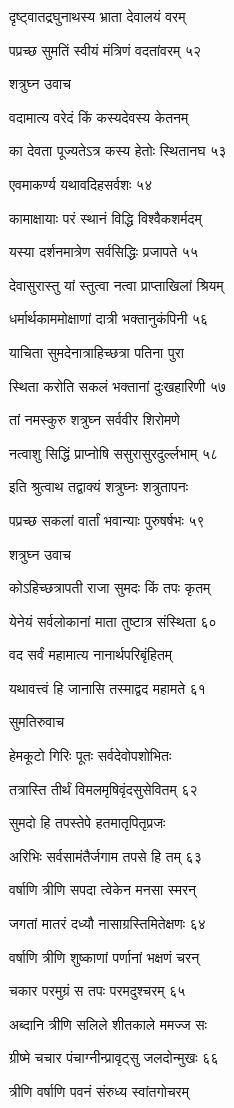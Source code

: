 दृष्ट्वातद्रघुनाथस्य भ्राता देवालयं वरम्

पप्रच्छ सुमतिं स्वीयं मंत्रिणं वदतांवरम् ५२

शत्रुघ्न उवाच

वदामात्य वरेदं किं कस्यदेवस्य केतनम्

का देवता पूज्यतेऽत्र कस्य हेतोः स्थितानघ ५३

एवमाकर्ण्य यथावदिहसर्वशः ५४

कामाक्षायाः परं स्थानं विद्धि विश्वैकशर्मदम्

यस्या दर्शनमात्रेण सर्वसिद्धिः प्रजापते ५५

देवासुरास्तु यां स्तुत्वा नत्वा प्राप्ताखिलां श्रियम्

धर्मार्थकाममोक्षाणां दात्री भक्तानुकंपिनी ५६

याचिता सुमदेनात्राहिच्छत्रा पतिना पुरा

स्थिता करोति सकलं भक्तानां दुःखहारिणी ५७

तां नमस्कुरु शत्रुघ्न सर्ववीर शिरोमणे

नत्वाशु सिद्धिं प्राप्नोषि ससुरासुरदुर्ल्लभाम् ५८

इति श्रुत्वाथ तद्वाक्यं शत्रुघ्नः शत्रुतापनः

पप्रच्छ सकलां वार्तां भवान्याः पुरुषर्षभः ५९

शत्रुघ्न उवाच

कोऽहिच्छत्रापती राजा सुमदः किं तपः कृतम्

येनेयं सर्वलोकानां माता तुष्टात्र संस्थिता ६०

वद सर्वं महामात्य नानार्थपरिबृंहितम्

यथावत्त्वं हि जानासि तस्माद्वद महामते ६१

सुमतिरुवाच

हेमकूटो गिरिः पूतः सर्वदेवोपशोभितः

तत्रास्ति तीर्थं विमलमृषिवृंदसुसेवितम् ६२

सुमदो हि तपस्तेपे हतमातृपितृप्रजः

अरिभिः सर्वसामंतैर्जगाम तपसे हि तम् ६३

वर्षाणि त्रीणि सपदा त्वेकेन मनसा स्मरन्

जगतां मातरं दध्यौ नासाग्रस्तिमितेक्षणः ६४

वर्षाणि त्रीणि शुष्काणां पर्णानां भक्षणं चरन्

चकार परमुग्रं स तपः परमदुश्चरम् ६५

अब्दानि त्रीणि सलिले शीतकाले ममज्ज सः

ग्रीष्मे चचार पंचाग्नीन्प्रावृट्सु जलदोन्मुखः ६६

त्रीणि वर्षाणि पवनं संरुध्य स्वांतगोचरम्


